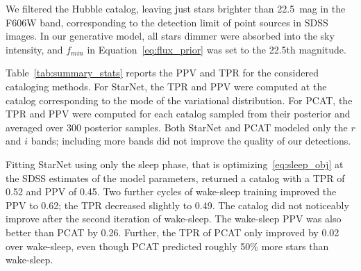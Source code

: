 We filtered the Hubble catalog, leaving just stars brighter than 22.5~mag in the F606W band, corresponding to the detection limit of point sources in SDSS images. 
In our generative model, all stars dimmer were absorbed into the sky intensity, and $f_{min}$ in Equation~\eqref{eq:flux_prior} was set to the 22.5th magnitude. 

Table~\ref{tab:summary_stats} reports the PPV and TPR for the considered cataloging methods.
For StarNet, the TPR and PPV were computed at the catalog corresponding to the mode of the variational distribution. 
For PCAT, the TPR and PPV were computed for each catalog sampled from their posterior and averaged over 300 posterior samples. 
Both StarNet and PCAT modeled only the $r$ and $i$ bands;
including more bands did not improve the quality of our detections. 

Fitting StarNet using only the sleep phase, that is optimizing~\eqref{eq:sleep_obj} at the SDSS estimates of the model parameters, returned 
a catalog with a TPR of 0.52 and PPV of 0.45. Two further cycles of wake-sleep training improved the PPV to 0.62; the TPR decreased slightly to 0.49. The catalog did not noticeably improve after the second iteration of wake-sleep. The wake-sleep PPV was also better than PCAT by 0.26. Further, the TPR of PCAT
only improved by 0.02 over wake-sleep, even though PCAT predicted roughly 50\% more stars than wake-sleep. 



